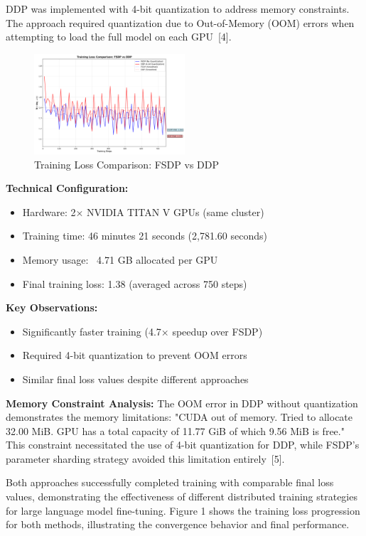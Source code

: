 \documentclass{assignment7_report}
\begin{document}
DDP was implemented with 4-bit quantization to address memory constraints. The approach required quantization due to Out-of-Memory (OOM) errors when attempting to load the full model on each GPU~[4].

\begin{figure}[h!]
    \centering
    \includegraphics[width=0.5\textwidth]{training_loss_comparison.png}
    \caption{Training Loss Comparison: FSDP vs DDP}
    \label{fig:training_loss_comparison}
\end{figure}

\textbf{Technical Configuration:}
\begin{itemize}
    \item Hardware: 2× NVIDIA TITAN V GPUs (same cluster)
    \item Training time: 46 minutes 21 seconds (2,781.60 seconds)
    \item Memory usage: ~4.71 GB allocated per GPU
    \item Final training loss: 1.38 (averaged across 750 steps)
\end{itemize}

\textbf{Key Observations:}
\begin{itemize}
    \item Significantly faster training (4.7× speedup over FSDP)
    \item Required 4-bit quantization to prevent OOM errors
    \item Similar final loss values despite different approaches
\end{itemize}

\textbf{Memory Constraint Analysis:}
The OOM error in DDP without quantization demonstrates the memory limitations: "CUDA out of memory. Tried to allocate 32.00 MiB. GPU has a total capacity of 11.77 GiB of which 9.56 MiB is free." This constraint necessitated the use of 4-bit quantization for DDP, while FSDP's parameter sharding strategy avoided this limitation entirely~[5].

Both approaches successfully completed training with comparable final loss values, demonstrating the effectiveness of different distributed training strategies for large language model fine-tuning. Figure 1 shows the training loss progression for both methods, illustrating the convergence behavior and final performance.
\end{document}

